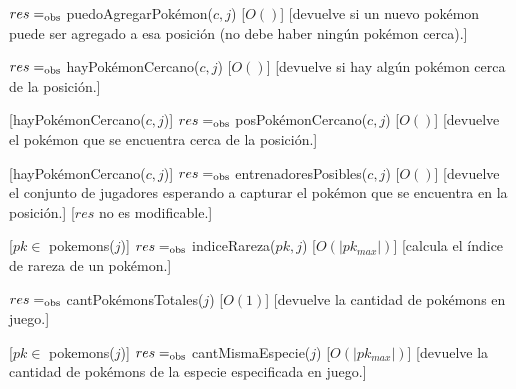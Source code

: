 \begin{Interfaz}
	{$res =_{\mathrm{obs}}$ puedoAgregarPokémon($c,j$)}
	[$O()$]
	[devuelve si un nuevo pokémon puede ser agregado a esa posición (no debe haber ningún pokémon cerca).]

	{$res =_{\mathrm{obs}}$ hayPokémonCercano($c,j$)}
	[$O()$]
	[devuelve si hay algún pokémon cerca de la posición.]

	[hayPokémonCercano($c,j$)]
	{$res =_{\mathrm{obs}}$ posPokémonCercano($c,j$)}
	[$O()$]
	[devuelve el pokémon que se encuentra cerca de la posición.]

	[hayPokémonCercano($c,j$)]
	{$res =_{\mathrm{obs}}$ entrenadoresPosibles($c,j$)}
	[$O()$]
	[devuelve el conjunto de jugadores esperando a capturar el pokémon que se encuentra en la posición.]
	[$res$ no es modificable.]

	[$pk \in$ pokemons($j$)]
	{$res =_{\mathrm{obs}}$ indiceRareza($pk,j$)}
	[$O(|pk_{max}|)$]
	[calcula el índice de rareza de un pokémon.]

	{$res =_{\mathrm{obs}}$ cantPokémonsTotales($j$)}
	[$O(1)$]
	[devuelve la cantidad de pokémons en juego.]

	[$pk \in$ pokemons($j$)]
	{$res =_{\mathrm{obs}}$ cantMismaEspecie($j$)}
	[$O(|pk_{max}|)$]
	[devuelve la cantidad de pokémons de la especie especificada en juego.]

\end{Interfaz}

